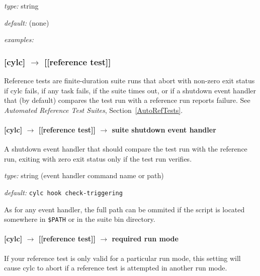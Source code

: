 \begin{myitemize}
    \item {\em type:} string
    \item {\em default:} (none)
    \item {\em examples:}
\end{myitemize}


\subsubsection[{[[}reference test{]]}]{[cylc] $\rightarrow$ [[reference test]] }
\label{ReferenceTestConfig}

Reference tests are finite-duration suite runs that abort with non-zero
exit status if cylc fails, if any task fails, if the suite times
out, or if a shutdown event handler that (by default) compares the test
run with a reference run reports failure. See {\em Automated Reference Test
Suites}, Section~\ref{AutoRefTests}.

\paragraph[suite shutdown event handler]{[cylc] $\rightarrow$ [[reference test]] $\rightarrow$ suite shutdown event handler}

A shutdown event handler that should compare the test run with the
reference run, exiting with zero exit status only if the test run
verifies.

\begin{myitemize}
    \item {\em type:} string (event handler command name or path)
    \item {\em default:} \lstinline=cylc hook check-triggering=
\end{myitemize}
As for any event handler, the full path can be ommited if the script is
located somewhere in \lstinline=$PATH= or in the suite bin directory.

\paragraph[required run mode]{[cylc] $\rightarrow$ [[reference test]] $\rightarrow$ required run mode}

If your reference test is only valid for a particular run mode, this
setting will cause cylc to abort if a reference test is attempted
in another run mode.

